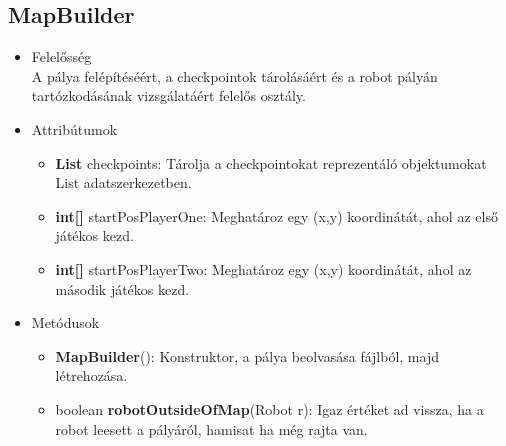 \subsection{MapBuilder}
\begin{itemize}
\item Felelősség\\
A pálya felépítéséért, a checkpointok tárolásáért és a robot pályán tartózkodásának vizsgálatáért felelős osztály.
\item Attribútumok
	\begin{itemize}
		\item \textbf{List} checkpoints: Tárolja a checkpointokat reprezentáló objektumokat List adatszerkezetben.
		\item \textbf{int[]} startPosPlayerOne: Meghatároz egy (x,y) koordinátát, ahol az első játékos kezd.
		\item \textbf{int[]} startPosPlayerTwo: Meghatároz egy (x,y) koordinátát, ahol az második játékos kezd.
	\end{itemize}
\item Metódusok
	\begin{itemize}
		\item \textbf{MapBuilder}(): Konstruktor, a pálya beolvasása fájlból, majd létrehozása.
		\item boolean \textbf{robotOutsideOfMap}(Robot r): Igaz értéket ad vissza, ha a robot leesett a pályáról, hamisat ha még rajta van.
	\end{itemize}
\end{itemize}

